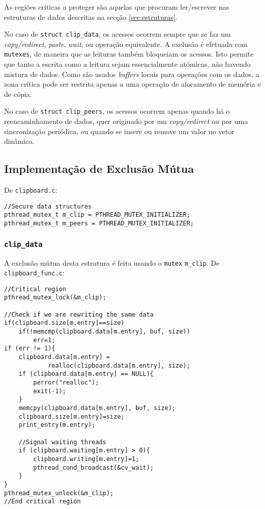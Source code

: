 \documentclass{article}
\begin{document}
As regiões críticas a proteger são aquelas que procuram ler/escrever nas estruturas de dados descritas na secção \ref{sec:estruturas}. 

No caso de \texttt{struct clip_data}, os acessos ocorrem sempre que se faz um \textit{copy/redirect}, \textit{paste}, \textit{wait}, ou operação equivalente. 
A exclusão é efetuada com \texttt{mutexes}, de maneira que as leituras também bloqueiam os acessos.
Isto permite que tanto a escrita como a leitura sejam essencialmente atómicas, não havendo mistura de dados.
Como são usados \textit{buffers} locais para operações com os dados, a zona crítica pode ser restrita apenas a uma operação de alocamento de memória e de cópia.

No caso de \texttt{struct clip_peers}, os acessos ocorrem apenas quando há o reencaminhamento de dados, quer originado por um \textit{copy/redirect} ou por uma sincronização periódica, ou quando se insere ou remove um valor no vetor dinâmico. 

\subsection{Implementação de Exclusão Mútua}
De \texttt{clipboard.c}: 
\begin{verbatim}
//Secure data structures
pthread_mutex_t m_clip = PTHREAD_MUTEX_INITIALIZER;
pthread_mutex_t m_peers = PTHREAD_MUTEX_INITIALIZER;
\end{verbatim}
\subsubsection{\texttt{clip\_data}}

A exclusão mútua desta estrutura é feita usando o \texttt{mutex} \texttt{m\_clip}. De \texttt{clipboard\_func.c}:
\begin{verbatim}
//Critical region
pthread_mutex_lock(&m_clip);
			
//Check if we are rewriting the same data
if(clipboard.size[m.entry]==size)
	if(!memcmp(clipboard.data[m.entry], buf, size))
		err=1;
if (err != 1){	
	clipboard.data[m.entry] = 
			realloc(clipboard.data[m.entry], size);					
	if (clipboard.data[m.entry] == NULL){
		perror("realloc");
		exit(-1);
	}
	memcpy(clipboard.data[m.entry], buf, size);
	clipboard.size[m.entry]=size;
	print_entry(m.entry);
						
	//Signal waiting threads
	if (clipboard.waiting[m.entry] > 0){
		clipboard.writing[m.entry]=1;
		pthread_cond_broadcast(&cv_wait);
	}
}
pthread_mutex_unlock(&m_clip);
//End critical region	
\end{verbatim}
\end{document}
